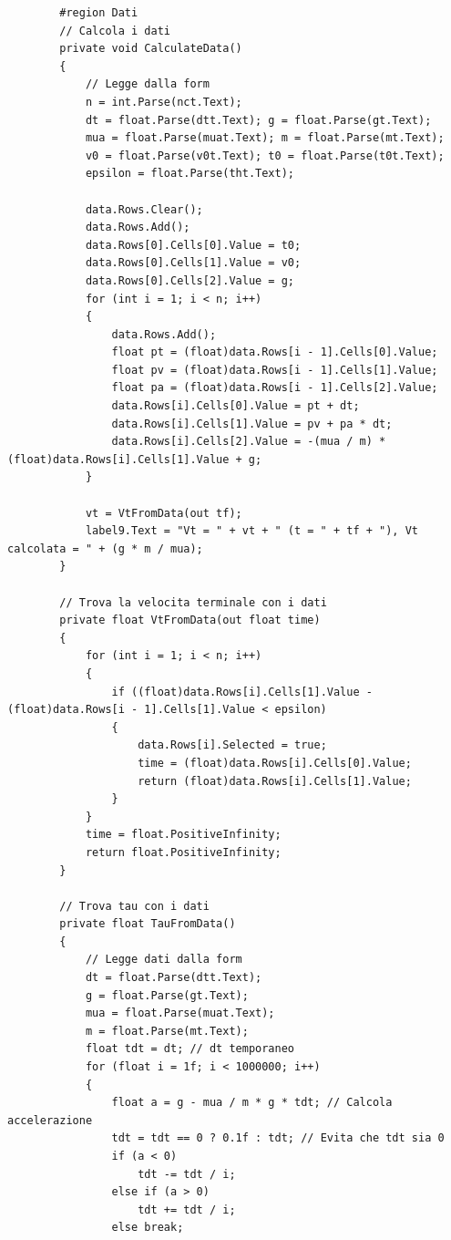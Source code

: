 \documentclass[11pt]{article} %
\begin{document}
\begin{lstlisting}
        #region Dati
        // Calcola i dati
        private void CalculateData()
        {
            // Legge dalla form
            n = int.Parse(nct.Text);
            dt = float.Parse(dtt.Text); g = float.Parse(gt.Text);
            mua = float.Parse(muat.Text); m = float.Parse(mt.Text);
            v0 = float.Parse(v0t.Text); t0 = float.Parse(t0t.Text);
            epsilon = float.Parse(tht.Text);

            data.Rows.Clear();
            data.Rows.Add();
            data.Rows[0].Cells[0].Value = t0;
            data.Rows[0].Cells[1].Value = v0;
            data.Rows[0].Cells[2].Value = g;
            for (int i = 1; i < n; i++)
            {
                data.Rows.Add();
                float pt = (float)data.Rows[i - 1].Cells[0].Value;
                float pv = (float)data.Rows[i - 1].Cells[1].Value;
                float pa = (float)data.Rows[i - 1].Cells[2].Value;
                data.Rows[i].Cells[0].Value = pt + dt;
                data.Rows[i].Cells[1].Value = pv + pa * dt;
                data.Rows[i].Cells[2].Value = -(mua / m) * (float)data.Rows[i].Cells[1].Value + g;
            }

            vt = VtFromData(out tf);
            label9.Text = "Vt = " + vt + " (t = " + tf + "), Vt calcolata = " + (g * m / mua);
        }

        // Trova la velocita terminale con i dati
        private float VtFromData(out float time)
        {
            for (int i = 1; i < n; i++)
            {
                if ((float)data.Rows[i].Cells[1].Value - (float)data.Rows[i - 1].Cells[1].Value < epsilon)
                {
                    data.Rows[i].Selected = true;
                    time = (float)data.Rows[i].Cells[0].Value;
                    return (float)data.Rows[i].Cells[1].Value;
                }
            }
            time = float.PositiveInfinity;
            return float.PositiveInfinity;
        }

        // Trova tau con i dati
        private float TauFromData()
        {
            // Legge dati dalla form
            dt = float.Parse(dtt.Text);
            g = float.Parse(gt.Text);
            mua = float.Parse(muat.Text);
            m = float.Parse(mt.Text);
            float tdt = dt; // dt temporaneo
            for (float i = 1f; i < 1000000; i++)
            {
                float a = g - mua / m * g * tdt; // Calcola accelerazione
                tdt = tdt == 0 ? 0.1f : tdt; // Evita che tdt sia 0
                if (a < 0)
                    tdt -= tdt / i;
                else if (a > 0)
                    tdt += tdt / i;
                else break;


\end{lstlisting}
\end{document}
